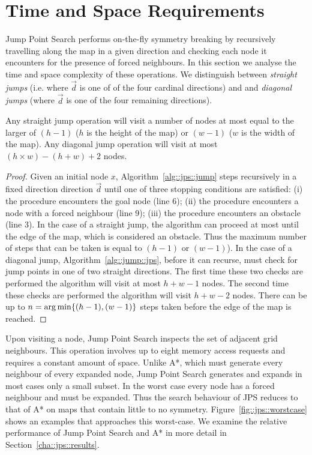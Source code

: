 \section{Time and Space Requirements}
Jump Point Search performs on-the-fly symmetry breaking by recursively travelling
along the map in a given direction and checking each node it encounters for the
presence of forced neighbours. In this section we analyse the time and space
complexity of these operations. We distinguish between \emph{straight jumps}
(i.e. where $\vec{d}$ is one of of the four cardinal directions) and 
and \emph{diagonal jumps} (where $\vec{d}$ is one of the four remaining directions).

\begin{lemma}
Any straight jump operation will visit a number of nodes at most equal to the
larger of $(h-1)$ ($h$ is the height of the map) or $(w-1)$ ($w$ is the width of the map).
Any diagonal jump operation will visit at most $(h \times w) - (h + w) + 2$ nodes.
\end{lemma}
\begin{proof}
Given an initial node $x$, Algorithm~\ref{alg::jps::jump} steps recursively in
a fixed direction direction $\vec{d}$ until one of three stopping conditions
are satisfied: (i) the procedure encounters the goal node (line 6); 
(ii) the procedure encounters a node with a forced neighbour (line 9); 
(iii) the procedure encounters an obstacle (line 3).  
In the case of a straight jump, the algorithm can proceed at most
until the edge of the map, which is considered an obstacle. Thus the maximum
number of steps that can be taken is equal to $(h-1)$ or $(w-1)$).  
In the case of a diagonal jump, Algorithm~\ref{alg::jump::jps}, before it can
recurse, must check for jump points in one of two straight directions. The
first time these two checks are performed the algorithm will visit at most $h
+ w - 1$ nodes. The second time these checks are performed the algorithm will
visit $h + w - 2$ nodes. There can be up to 
$n = \operatorname*{arg\,min} \lbrace (h-1), (w-1) \rbrace$ steps 
taken before the edge of the map is reached.
\end{proof}

Upon visiting a node, Jump Point Search inspects the set of adjacent grid
neighbours. This operation involves up to eight memory access requests and
requires a constant amount of space.  Unlike A*, which must generate every
neighbour of every expanded node, Jump Point Search generates and expands in
most cases only a small subset. In the worst case every node has a forced
neighbour and must be expanded. Thus the search behaviour of JPS reduces to
that of A* on maps that contain little to no symmetry.
Figure~\ref{fig::jps::worstcase} shows an examples that approaches this
worst-case. We examine the relative performance of Jump Point Search and A* in
more detail in Section~\ref{cha::jps::results}.
